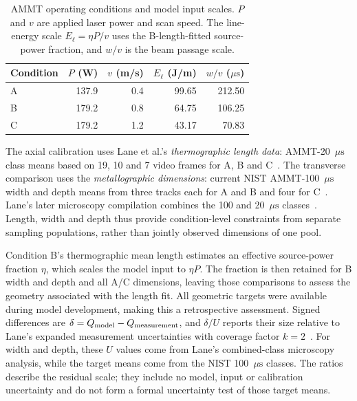 \documentclass[preprint,12pt]{elsarticle}
\newcommand{\us}{\ensuremath{\mu\mathrm{s}}}
\begin{document}
\begin{table}[htbp]
\centering
\caption{AMMT operating conditions and model input scales. $P$ and $v$ are applied laser power and scan speed. The line-energy scale $E_\ell=\eta P/v$ uses the B-length-fitted source-power fraction, and $w/v$ is the beam passage scale.}
\label{tab:conditions}
\begin{tabular}{lrrrr}
\toprule
Condition & $P$ (W) & $v$ (m/s) & $E_\ell$ (J/m) & $w/v$ (\us)\\
\midrule
A & 137.9 & 0.4 & 99.65 & 212.50\\
B & 179.2 & 0.8 & 64.75 & 106.25\\
C & 179.2 & 1.2 & 43.17 & 70.83\\
\bottomrule
\end{tabular}
\end{table}

The axial calibration uses Lane et al.'s \emph{thermographic length data}: AMMT-20~\us{} class means based on 19, 10 and 7 video frames for A, B and C~\cite{lane2020}. The transverse comparison uses the \emph{metallographic dimensions}: current NIST AMMT-100~\us{} width and depth means from three tracks each for A and B and four for C~\cite{nist2018}. Lane's later microscopy compilation combines the 100 and 20~\us{} classes~\cite{lane2020}. Length, width and depth thus provide condition-level constraints from separate sampling populations, rather than jointly observed dimensions of one pool.

Condition B's thermographic mean length estimates an effective source-power fraction $\eta$, which scales the model input to $\eta P$. The fraction is then retained for B width and depth and all A/C dimensions, leaving those comparisons to assess the geometry associated with the length fit. All geometric targets were available during model development, making this a retrospective assessment. Signed differences are $\delta=Q_{\rm model}-Q_{\rm measurement}$, and $\delta/U$ reports their size relative to Lane's expanded measurement uncertainties with coverage factor $k=2$~\cite{lane2020}. For width and depth, these $U$ values come from Lane's combined-class microscopy analysis, while the target means come from the NIST 100~\us{} classes. The ratios describe the residual scale; they include no model, input or calibration uncertainty and do not form a formal uncertainty test of those target means.
\end{document}

